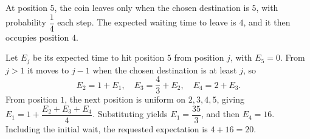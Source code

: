 At position $5$, the coin leaves only when the chosen destination is $5$, with probability $\dfrac{1}{4}$ each step. The expected waiting time to leave is $4$, and it then occupies position $4$.

Let $E_j$ be its expected time to hit position $5$ from position $j$, with $E_5=0$. From $j>1$ it moves to $j-1$ when the chosen destination is at least $j$, so
\[
E_2=1+E_1,\quad E_3=\dfrac{4}{3}+E_2,\quad E_4=2+E_3.
\]
From position $1$, the next position is uniform on $2,3,4,5$, giving
$E_1=1+\dfrac{E_2+E_3+E_4}{4}$.
Substituting yields $E_1=\dfrac{35}{3}$, and then $E_4=16$. Including the initial wait, the requested expectation is $\boxed{4+16=20}$.
